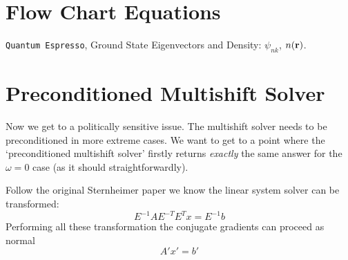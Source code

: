 \documentclass{article}
\def\r{{\bf r}}
\begin{document}
\section{Flow Chart Equations}

{\tt Quantum Espresso}, Ground State Eigenvectors and Density: $\psi_{nk}$, $n(\r)$.


\section{Preconditioned Multishift Solver}
Now we get to a politically sensitive issue. The multishift solver 
needs to be preconditioned in more extreme cases. 
We want to get to a point where the `preconditioned multishift solver' 
firstly returns \emph{exactly} the same answer 
for the $\omega=0$ case (as it should straightforwardly).

Follow the original Sternheimer paper we know the linear system solver can be transformed:
%
\begin{equation}
E^{-1}AE^{-T}E^{T}x = E^{-1}b
\end{equation}
%
Performing all these transformation the conjugate gradients can proceed as normal
%
\begin{equation}
A'x' =b'
\end{equation}
\end{document}
